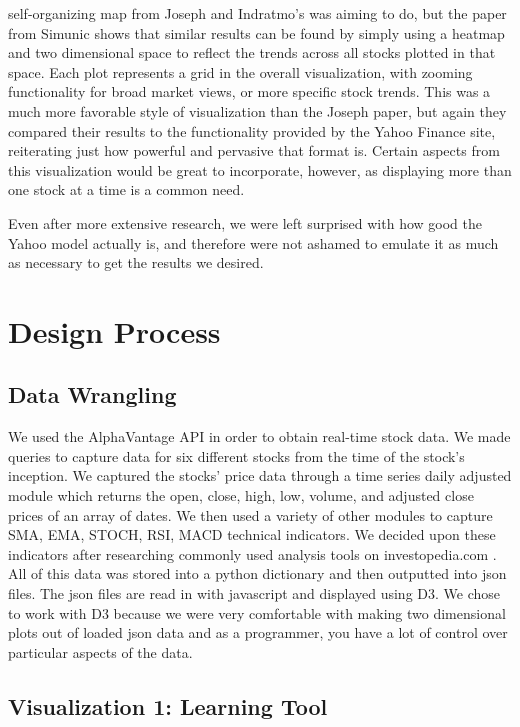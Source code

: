 \documentclass{vgtc}                          %
\begin{document}
self-organizing map from Joseph and Indratmo’s was aiming to do, but the paper from Simunic \cite{article}
shows that similar results can be found by simply using a heatmap and two dimensional space to reflect
the trends across all stocks plotted in that space. Each plot represents a grid in the overall visualization,
with zooming functionality for broad market views, or more specific stock trends. This was a much more
favorable style of visualization than the Joseph paper, but again they compared their results to the
functionality provided by the Yahoo Finance site, reiterating just how powerful and pervasive that
format is. Certain aspects from this visualization would be great to incorporate, however, as displaying
more than one stock at a time is a common need.

Even after more extensive research, we were left surprised with how good the Yahoo model
actually is, and therefore were not ashamed to emulate it as much as necessary to get the results we
desired. 
\section{Design Process}
\subsection{Data Wrangling}
We used the AlphaVantage API \cite{alpha} in order to obtain real-time stock data. We made queries to
capture data for six different stocks from the time of the stock’s inception. We captured the stocks’
price data through a time series daily adjusted module which returns the open, close, high, low, volume,
and adjusted close prices of an array of dates. We then used a variety of other modules to capture SMA,
EMA, STOCH, RSI, MACD technical indicators. We decided upon these indicators after researching commonly used analysis tools on investopedia.com \cite{invest}.  All of this data was stored into a python dictionary and then
outputted into json files. The json files are read in with javascript and displayed using D3.  We chose to work with D3 because we were very comfortable with making two dimensional plots out of loaded json data and as a programmer, you have a lot of control over particular aspects of the data.

\subsection{Visualization 1: Learning Tool}
\end{document}
